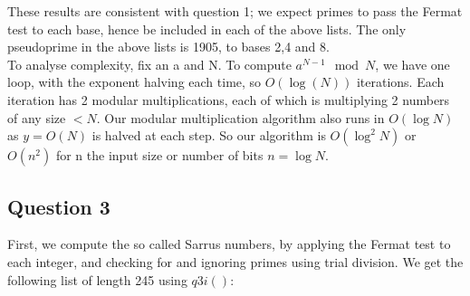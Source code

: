 \documentclass[10pt,a4paper]{report}
\begin{document}
These results are consistent with question 1; we expect primes to pass the Fermat test to each base, hence be included in each of the above lists. The only pseudoprime in the above lists is 1905, to bases 2,4 and 8.\\


To analyse complexity, fix an a and N. To compute $a^{N-1}\mod N$, we have one loop, with the exponent halving each time, so $O(\log(N))$ iterations. Each iteration has 2 modular multiplications, each of which is multiplying 2 numbers of any size $<N$. Our modular multiplication algorithm also runs in $O(\log{N})$ as $y=O(N)$ is halved at each step. So our algorithm is $O(\log^2{N})$ or $O(n^2)$ for n the input size or number of bits $n=\log{N}$.



\subsection*{Question 3}

First, we compute the so called Sarrus numbers, by applying the Fermat test to each integer, and checking for and ignoring primes using trial division. We get the following list of length 245 using $q3i()$:
\end{document}
